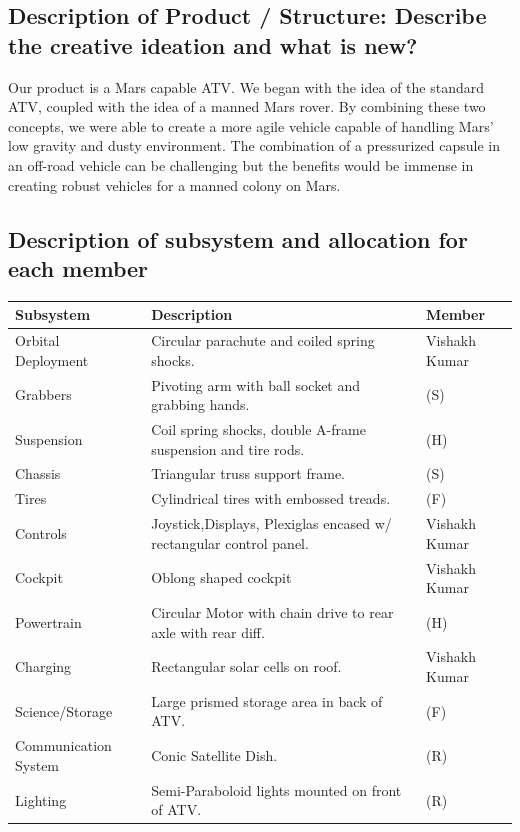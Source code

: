 \subsection{Description of Product / Structure: Describe the creative ideation and what is new?}

Our product is a Mars capable ATV. We began with the idea of the standard ATV, coupled with the idea of a manned Mars rover. By combining these two concepts, we were able to create a more agile vehicle capable of handling Mars’ low gravity and dusty environment. The combination of a pressurized capsule in an off-road vehicle can be challenging but the benefits would be immense in creating robust vehicles for a manned colony on Mars.

\subsection{Description of subsystem and allocation for each member}

\begin{center}
\begin{tabular}{lll}
\hline
Subsystem & Description & Member\\
\hline
Orbital Deployment & Circular parachute and coiled spring shocks. & Vishakh Kumar\\
Grabbers & Pivoting arm with ball socket and grabbing hands. & (S)\\
Suspension & Coil spring shocks, double A-frame suspension and tire rods. & (H)\\
Chassis & Triangular truss support frame. & (S)\\
Tires & Cylindrical tires with embossed treads. & (F)\\
Controls & Joystick,Displays, Plexiglas encased w/ rectangular control panel. & Vishakh Kumar\\
Cockpit & Oblong shaped cockpit & Vishakh Kumar\\
Powertrain & Circular Motor with chain drive to rear axle with rear diff. & (H)\\
Charging & Rectangular solar cells on roof. & Vishakh Kumar\\
Science/Storage & Large prismed storage area in back of ATV. & (F)\\
Communication System & Conic Satellite Dish. & (R)\\
Lighting & Semi-Paraboloid lights mounted on front of ATV. & (R)\\
\hline
\end{tabular}
\end{center}

